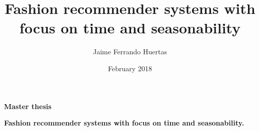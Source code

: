 \documentclass{tex_files/kththesis}
\title{Fashion recommender systems with focus on time and 
        seasonability}
\author{Jaime Ferrando Huertas }
\date{February 2018}
\begin{document}
\begin{titlepage}
 

\end{titlepage}

\begin{titlepage}
    \begin{center}


        \begin{figure}\centering
        \hfill
        \par 
        \end{figure}
        
        
        
        \textbf{\Large{Master thesis}}
        
        \vspace{0.5cm}
        \textbf{Fashion recommender systems with focus on time and 
        seasonability.}
    

\end{center}
\end{titlepage}
\end{document}

